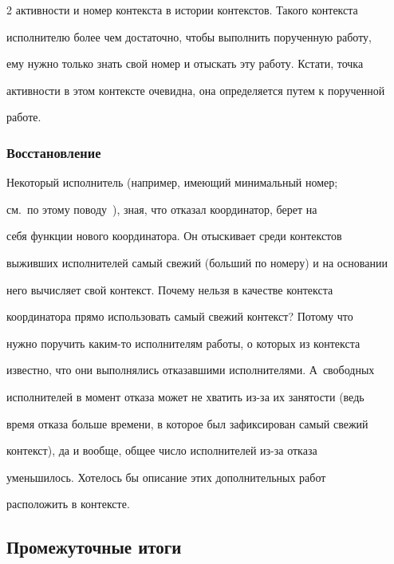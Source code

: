 \begin{multicols}{2}
активности и номер контекста в истории контекстов. Такого контекста 


исполнителю более чем достаточно, чтобы выполнить порученную работу, 


ему нужно только знать свой номер и отыскать эту работу. Кстати, точка 


активности в этом контексте очевидна, она определяется путем к порученной 


работе.


      


\subsubsection{Восстановление}


      


      Некоторый исполнитель (например, имеющий минимальный номер; 


см.\ по этому поводу~\cite{13-koz}), зная, что отказал координатор, берет на 


себя функции нового координатора. Он отыскивает среди контекстов 


выживших исполнителей самый свежий (больший по номеру) и на основании 


него вычисляет свой контекст. Почему нельзя в качестве контекста 


координатора прямо использовать самый свежий контекст? Потому что 


нужно поручить ка\-ким-то исполнителям работы, о которых из контекста 


известно, что они выполнялись отказавшими исполнителями. А~свободных 


исполнителей в момент отказа может не хватить из-за их за\-ня\-тости (ведь 


время отказа больше времени, в которое был зафиксирован самый свежий 


контекст), да и вообще, общее число исполнителей из-за отказа 


уменьшилось. Хотелось бы описание этих дополнительных работ 


расположить в контексте. 





\subsection{Промежуточные итоги}



\end{multicols}
